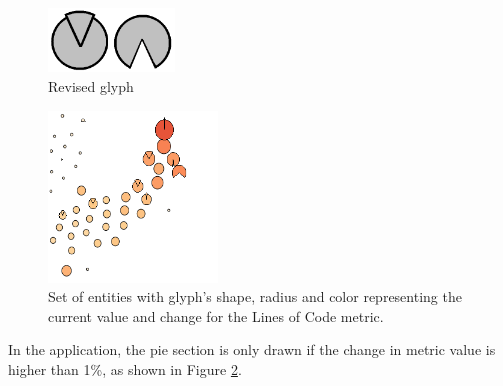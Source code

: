 \begin{figure}[H]
  \centering
  \includegraphics[width=0.3\textwidth]{figures/glyphs_2.png}
  \caption{Revised glyph}
  \label{fig:glyphs2}
\end{figure}

\begin{figure}[H]
  \centering
  \includegraphics[width=0.4\textwidth]{figures/glyphs_3.png}
  \caption{Set of entities with glyph's shape, radius and color representing the current value and change for the Lines of Code metric.}
  \label{fig:glyphs3}
\end{figure}

In the application, the pie section is only drawn if the change in metric value is higher than 1\%, as shown in Figure \ref{fig:glyphs3}.
